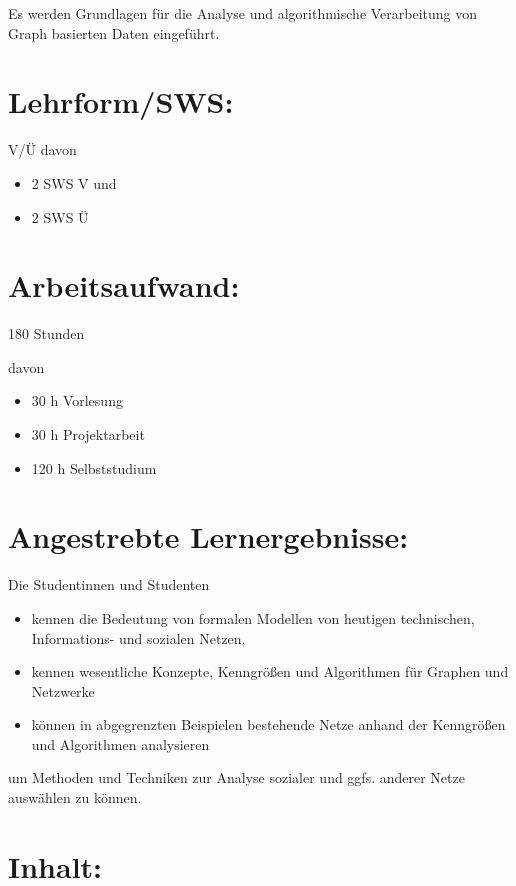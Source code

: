 Es werden Grundlagen für die Analyse und algorithmische Verarbeitung von
Graph basierten Daten eingeführt.

\section*{Lehrform/SWS:}\label{lehrformsws-12}

V/Ü davon

\begin{itemize}
\tightlist
\item
  2 SWS V und
\item
  2 SWS Ü
\end{itemize}

\section*{Arbeitsaufwand:}\label{arbeitsaufwand-17}

180 Stunden

davon

\begin{itemize}
\tightlist
\item
  30 h Vorlesung
\item
  30 h Projektarbeit
\item
  120 h Selbststudium
\end{itemize}

\section*{Angestrebte
Lernergebnisse:}\label{angestrebte-lernergebnisse-11}

Die Studentinnen und Studenten

\begin{itemize}
\tightlist
\item
  kennen die Bedeutung von formalen Modellen von heutigen technischen,
  Informations- und sozialen Netzen,
\item
  kennen wesentliche Konzepte, Kenngrößen und Algorithmen für Graphen
  und Netzwerke
\item
  können in abgegrenzten Beispielen bestehende Netze anhand der
  Kenngrößen und Algorithmen analysieren
\end{itemize}

um Methoden und Techniken zur Analyse sozialer und ggfs. anderer Netze
auswählen zu können.

\section*{Inhalt:}\label{inhalt-11}

